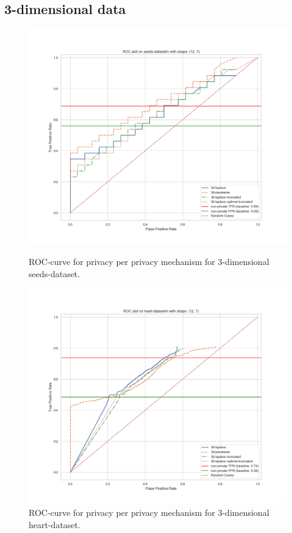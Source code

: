 \subsection{3-dimensional data}
\begin{figure}[H]
    \centering
    \begin{minipage}[c]{0.49\textwidth}
        \includegraphics[width=1\textwidth]{Results/RQ2/seeds-dataset/roc_plot.png}
        \caption{ROC-curve for privacy per privacy mechanism for 3-dimensional seeds-dataset.}
        \label{fig:privacy_seeds-dataset_comparison_3d_roc_plot}
    \end{minipage}
    \begin{minipage}[c]{0.49\textwidth}
        \includegraphics[width=1\textwidth]{Results/RQ2/heart-dataset/roc_plot.png}
        \caption{ROC-curve for privacy per privacy mechanism for 3-dimensional heart-dataset.}
        \label{fig:privacy_heart-dataset_comparison_3d_roc_plot}
    \end{minipage}
\end{figure}

